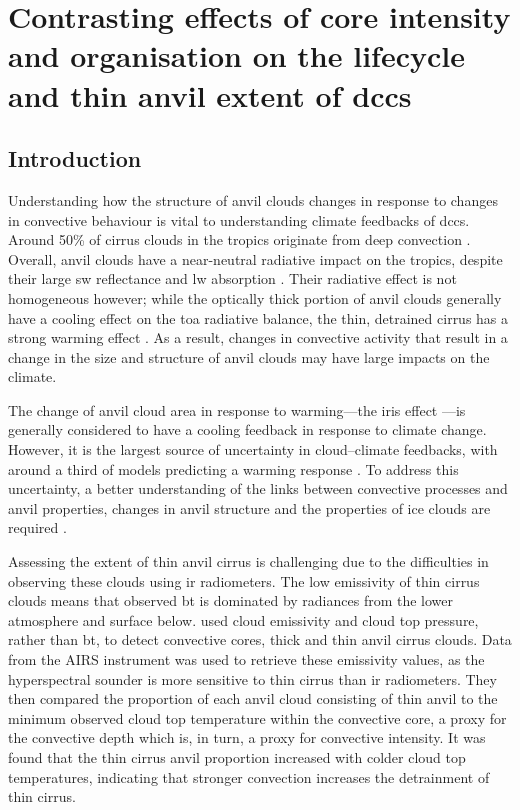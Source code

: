 \chapter{Contrasting effects of core intensity and organisation on the lifecycle and thin anvil extent of \acrshort{dcc}s} \label{chp:anvil_structure}

\section{Introduction}

Understanding how the structure of anvil clouds changes in response to changes in convective behaviour is vital to understanding climate feedbacks of \acrshort{dcc}s.
Around 50\% of cirrus clouds in the tropics originate from deep convection \citep{massie_distribution_2002, luo_characterizing_2004}.
Overall, anvil clouds have a near-neutral radiative impact on the tropics, despite their large \acrshort{sw} reflectance and \acrshort{lw} absorption \citep{hartmann_effect_1992, hartmann_tropical_2016}.
Their radiative effect is not homogeneous however; while the optically thick portion of anvil clouds generally have a cooling effect on the \acrshort{toa} radiative balance, the thin, detrained cirrus has a strong warming effect \citep{berry_cloud_2014}.
As a result, changes in convective activity that result in a change in the size and structure of anvil clouds may have large impacts on the climate.

The change of anvil cloud area in response to warming---the iris effect \citep{lindzen_does_2001, bony_thermodynamic_2016}---is generally considered to have a cooling feedback in response to climate change.
However, it is the largest source of uncertainty in cloud--climate feedbacks, with around a third of models predicting a warming response \citep{sherwood_assessment_2020}.
To address this uncertainty, a better understanding of the links between convective processes and anvil properties, changes in anvil structure and the properties of ice clouds are required \citep{gasparini_opinion_2023}.

Assessing the extent of thin anvil cirrus is challenging due to the difficulties in observing these clouds using \acrshort{ir} radiometers.
The low emissivity of thin cirrus clouds means that observed \acrshort{bt} is dominated by radiances from the lower atmosphere and surface below.
\citet{protopapadaki_upper_2017} used cloud emissivity and cloud top pressure, rather than \acrshort{bt}, to detect convective cores, thick and thin anvil cirrus clouds.
Data from the AIRS instrument was used to retrieve these emissivity values, as the hyperspectral sounder is more sensitive to thin cirrus than \acrshort{ir} radiometers.
They then compared the proportion of each anvil cloud consisting of thin anvil to the minimum observed cloud top temperature within the convective core, a proxy for the convective depth which is, in turn, a proxy for convective intensity.
It was found that the thin cirrus anvil proportion increased with colder cloud top temperatures, indicating that stronger convection increases the detrainment of thin cirrus.

